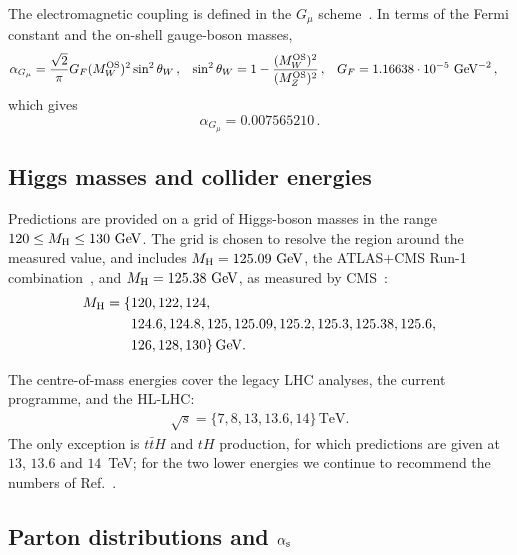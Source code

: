 The electromagnetic coupling is defined in the $G_\mu$
scheme~\cite{Denner:2000bj}. In terms of the Fermi constant and the on-shell
gauge-boson masses,
\begin{align}
\alpha_{G_\mu}
&= \frac{\sqrt{2}}{\pi}G_F(M^{\mathrm{OS}}_W)^2\sin^2\theta_W\,,
&
\sin^2\theta_W
&=1-\frac{(M^{\mathrm{OS}}_W)^2}{(M^{\mathrm{OS}}_Z)^2}\,,
&
G_F&=1.16638\cdot10^{-5}~\mathrm{GeV}^{-2}\,,
\end{align}
which gives
\begin{equation}
\alpha_{G_\mu}=0.007565210\,.
\end{equation}

\subsection{Higgs masses and collider energies}
Predictions are provided on a grid of Higgs-boson masses in the range
$120\leq M_\mathrm{H}\leq130~\mathrm{GeV}$. The grid is chosen to resolve the region around the
measured value, and includes $M_\mathrm{H}=125.09~\mathrm{GeV}$, the ATLAS+CMS Run-1
combination~\cite{ATLAS:2015yey}, and $M_\mathrm{H}=125.38~\mathrm{GeV}$, as measured by
CMS~\cite{CMS:2020xrn}:
\begin{align}
M_\mathrm{H} = \{&120, 122, 124, \notag\\
        &124.6, 124.8, 125, 125.09, 125.2, 125.3, 125.38, 125.6, \notag\\
        &126, 128, 130\}\,\mathrm{GeV}.
\end{align}

The centre-of-mass energies cover the legacy LHC analyses, the current
programme, and the HL-LHC:
\begin{align}
\sqrt{s}=\{7,8,13,13.6,14\}\,\mathrm{TeV}.
\end{align}
The only exception is $t\bar tH$ and $tH$ production, for which predictions are
given at $13$, $13.6$ and $14$~TeV; for the two lower energies we continue to
recommend the numbers of Ref.~\cite{Karlberg:2024zxx}.


\subsection{Parton distributions and \texorpdfstring{$\alpha_{\mathrm{s}}$}{alpha\_s}}
\label{sec:pdf}

